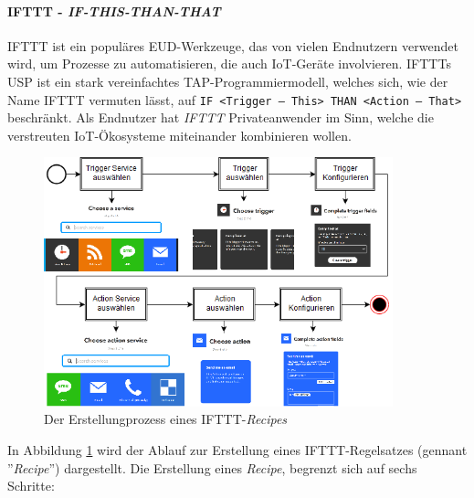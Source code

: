 \paragraph{IFTTT - \textit{IF-THIS-THAN-THAT}} IFTTT ist ein populäres \ac{EUD}-Werkzeuge, das von vielen Endnutzern verwendet wird, um Prozesse zu automatisieren, die auch \ac{IoT}-Geräte involvieren. IFTTTs \ac{USP} ist ein stark vereinfachtes \ac{TAP}-Programmiermodell, welches sich, wie der Name IFTTT vermuten lässt, auf \texttt{IF <Trigger -- This> THAN <Action -- That>} beschränkt. Als Endnutzer hat \textit{IFTTT} Privateanwender im Sinn, welche die verstreuten \ac{IoT}-Ökosysteme miteinander kombinieren wollen.
\begin{figure}[h]
    \centering
    \includegraphics[width=0.9\textwidth]{bilder/chapter2/iftttproz.png}
    \caption{Der Erstellungprozess eines IFTTT-\textit{Recipes}}
    \label{fig:iftttprocess}
\end{figure}
 In Abbildung \ref{fig:iftttprocess} wird der Ablauf zur Erstellung eines IFTTT-Regelsatzes (gennant ''\textit{Recipe}'') dargestellt. Die Erstellung eines \textit{Recipe}, begrenzt sich auf sechs Schritte:
